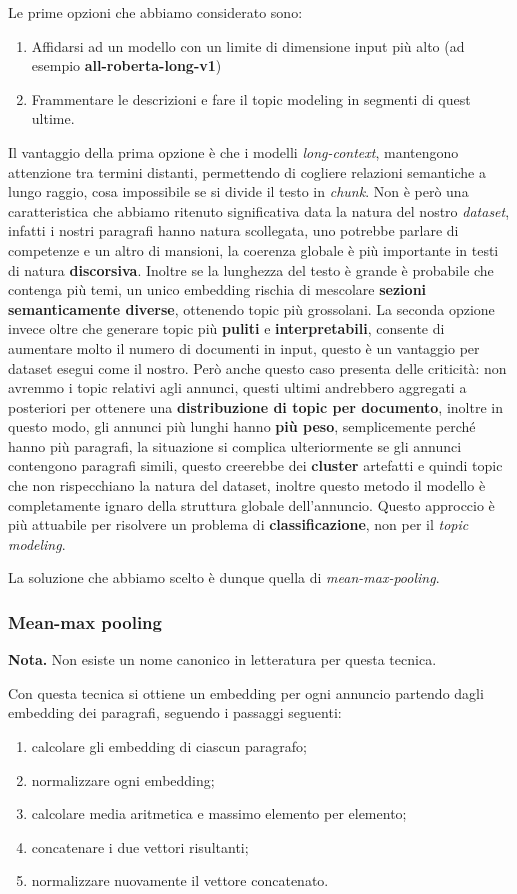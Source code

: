 \noindent Le prime opzioni che abbiamo considerato sono:
\begin{enumerate}
    \item Affidarsi ad un modello con un limite di dimensione input più alto (ad esempio \textbf{all-roberta-long-v1})
    \item Frammentare le descrizioni e fare il topic modeling in segmenti di quest ultime.
\end{enumerate}
Il vantaggio della prima opzione è che i modelli \textit{long-context}, mantengono attenzione tra termini distanti, permettendo di cogliere relazioni semantiche a lungo raggio, cosa impossibile se si divide il testo in \textit{chunk}.
Non è però una caratteristica che abbiamo ritenuto significativa data la natura del nostro \textit{dataset}, infatti i nostri paragrafi hanno natura scollegata, uno potrebbe parlare di competenze e un altro di mansioni, la coerenza globale è più importante in testi di natura \textbf{discorsiva}.
Inoltre se la lunghezza del testo è grande è probabile che contenga più temi, un unico embedding rischia di mescolare \textbf{sezioni semanticamente diverse}, ottenendo topic più grossolani.
La seconda opzione invece oltre che generare topic più \textbf{puliti} e \textbf{interpretabili}, consente di aumentare molto il numero di documenti in input, questo è un vantaggio per dataset esegui come il nostro.
Però anche questo caso presenta delle criticità: non avremmo i topic relativi agli annunci, questi ultimi andrebbero aggregati a posteriori per ottenere una \textbf{distribuzione di topic per documento}, inoltre in questo modo, gli annunci più lunghi hanno \textbf{più peso}, semplicemente perché hanno più paragrafi, la situazione si complica ulteriormente se gli annunci contengono paragrafi simili, questo creerebbe dei \textbf{cluster} artefatti e quindi topic che non rispecchiano la natura del dataset, inoltre questo metodo il modello è completamente ignaro della struttura globale dell'annuncio.
Questo approccio è più attuabile per risolvere un problema di \textbf{classificazione}, non per il \textit{topic modeling}.\medskip

La soluzione che abbiamo scelto è dunque quella di \textit{mean-max-pooling}.
\subsubsection{Mean-max pooling}
\noindent\textbf{Nota.} Non esiste un nome canonico in letteratura per questa tecnica.

\noindent Con questa tecnica si ottiene un embedding per ogni annuncio partendo dagli embedding dei paragrafi, seguendo i passaggi seguenti:
\begin{enumerate}
    \item calcolare gli embedding di ciascun paragrafo;
    \item normalizzare ogni embedding;
    \item calcolare media aritmetica e massimo elemento per elemento;
    \item concatenare i due vettori risultanti;
    \item normalizzare nuovamente il vettore concatenato.
\end{enumerate}

